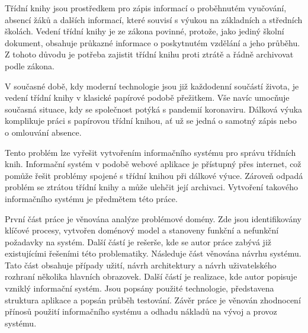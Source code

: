 \begin{introduction}
Třídní knihy jsou prostředkem pro zápis informací o proběhnutém vyučování, absencí žáků a dalších informací, které souvisí s výukou na základních a středních školách. Vedení třídní knihy je ze zákona povinné, protože, jako jediný školní dokument, obsahuje průkazné informace o poskytnutém vzdělání a jeho průběhu. Z tohoto důvodu je potřeba zajistit třídní knihu proti ztrátě a řádně archivovat podle zákona.

V současné době, kdy moderní technologie jsou již každodenní součástí života, je vedení třídní knihy v klasické papírové podobě přežitkem. Vše navíc umocňuje současná situace, kdy se společnost potýká s pandemií koronaviru. Dálková výuka komplikuje práci s papírovou třídní knihou, ať už se jedná o samotný zápis nebo o omlouvání absence. 

Tento problém lze vyřešit vytvořením informačního systému pro správu třídních knih. Informační systém v podobě webové aplikace je přístupný přes internet, což pomůže řešit problémy spojené s třídní knihou při dálkové výuce. Zároveň odpadá problém se ztrátou třídní knihy a může ulehčit její archivaci. Vytvoření takového informačního systému je předmětem této práce.

První část práce je věnována analýze problémové domény. Zde jsou identifikovány klíčové procesy, vytvořen doménový model a stanoveny funkční a nefunkční požadavky na systém. Další částí je rešerše, kde se autor práce zabývá již existujícími řešeními této problematiky. Následuje část věnována návrhu systému. Tato část obsahuje případy užití, návrh architektury a návrh uživatelského rozhraní několika hlavních obrazovek. Další částí je realizace, kde autor popisuje vzniklý informační systém. Jsou popsány použité technologie, představena struktura aplikace a popsán průběh testování. Závěr práce je věnován zhodnocení přínosů použití informačního systému a odhadu nákladů na vývoj a provoz systému.
\end{introduction}






